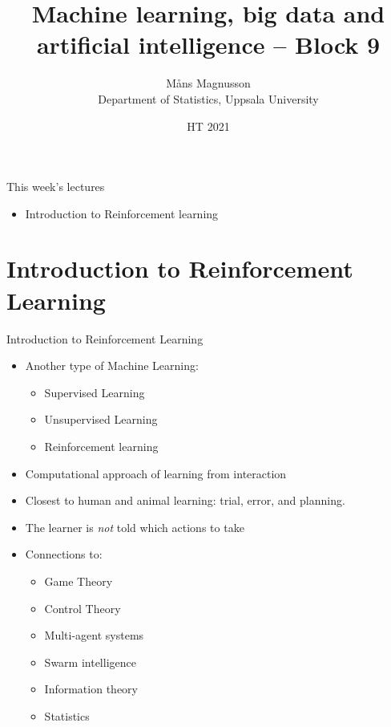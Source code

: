 \documentclass[10pt]{beamer}
\title[]{{\color{black}Machine learning, big data and artificial intelligence -- Block 9}}
\author[]{M{\aa}ns Magnusson\\Department of Statistics, Uppsala University}
\date{HT 2021}
\begin{document}
\frame{\titlepage
}



\begin{frame}{This week's lectures}
\begin{itemize}
\item Introduction to Reinforcement learning
\end{itemize}
\end{frame}



\section{Introduction to Reinforcement Learning}

\begin{frame}{Introduction to Reinforcement Learning}

\begin{itemize}
\item Another type of Machine Learning:
\begin{itemize}
\item Supervised Learning
\item Unsupervised Learning
\item {\color{uured} Reinforcement learning}
\end{itemize}
\pause
\item Computational approach of {\color{uured} learning from interaction}
\item Closest to human and animal learning: {\color{uured} trial, error, and planning.}
\item The learner is \emph{not} told which actions to take
\pause
\item Connections to:
\begin{itemize}
\item Game Theory
\item Control Theory
\item Multi-agent systems
\item Swarm intelligence
\item Information theory
\item Statistics
\end{itemize}
\end{itemize}

\end{frame}
\end{document}
